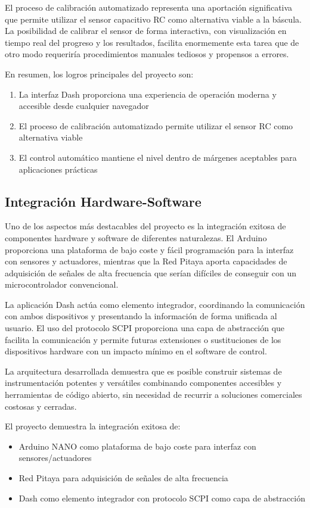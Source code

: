 \documentclass[12pt,a4paper]{article}
\begin{document}
El proceso de calibración automatizado representa una aportación significativa que permite utilizar el sensor capacitivo RC como alternativa viable a la báscula. La posibilidad de calibrar el sensor de forma interactiva, con visualización en tiempo real del progreso y los resultados, facilita enormemente esta tarea que de otro modo requeriría procedimientos manuales tediosos y propensos a errores.

En resumen, los logros principales del proyecto son:

\begin{enumerate}
    \item La interfaz Dash proporciona una experiencia de operación moderna y accesible desde cualquier navegador
    \item El proceso de calibración automatizado permite utilizar el sensor RC como alternativa viable
    \item El control automático mantiene el nivel dentro de márgenes aceptables para aplicaciones prácticas
\end{enumerate}

\subsection{Integración Hardware-Software}

Uno de los aspectos más destacables del proyecto es la integración exitosa de componentes hardware y software de diferentes naturalezas. El Arduino proporciona una plataforma de bajo coste y fácil programación para la interfaz con sensores y actuadores, mientras que la Red Pitaya aporta capacidades de adquisición de señales de alta frecuencia que serían difíciles de conseguir con un microcontrolador convencional.

La aplicación Dash actúa como elemento integrador, coordinando la comunicación con ambos dispositivos y presentando la información de forma unificada al usuario. El uso del protocolo SCPI proporciona una capa de abstracción que facilita la comunicación y permite futuras extensiones o sustituciones de los dispositivos hardware con un impacto mínimo en el software de control.

La arquitectura desarrollada demuestra que es posible construir sistemas de instrumentación potentes y versátiles combinando componentes accesibles y herramientas de código abierto, sin necesidad de recurrir a soluciones comerciales costosas y cerradas.

El proyecto demuestra la integración exitosa de:
\begin{itemize}
    \item Arduino NANO como plataforma de bajo coste para interfaz con sensores/actuadores
    \item Red Pitaya para adquisición de señales de alta frecuencia
    \item Dash como elemento integrador con protocolo SCPI como capa de abstracción
\end{itemize}
\end{document}
